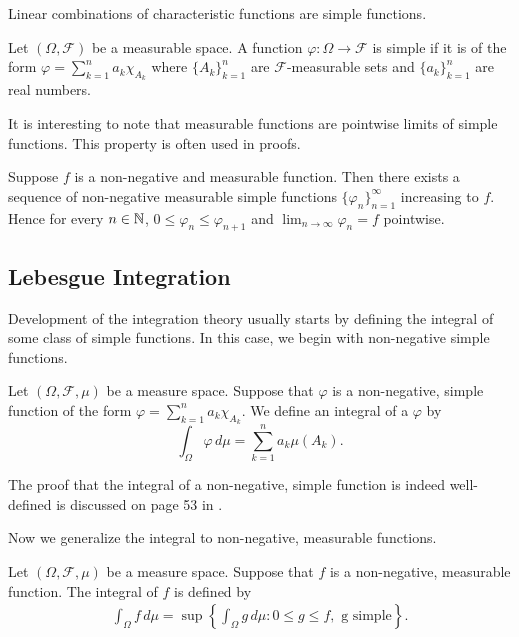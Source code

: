 Linear combinations of characteristic functions are simple functions.

\begin{definition}
Let $(\Omega, \mathcal{F})$ be a measurable space. A function $\varphi : \Omega \to \mathcal{F}$ is simple if it is of the form $\varphi = \sum_{k=1}^n a_k \chi_{A_k}$ where $\{ A_k \}_{k=1}^n$ are $\mathcal{F}$-measurable sets and $\{ a_k \}_{k=1}^n$ are real numbers. 
\end{definition}

It is interesting to note that measurable functions are pointwise limits of simple functions. This property is often used in proofs.
\begin{proposition}
Suppose $f$ is a non-negative and measurable function. Then there exists a sequence of non-negative measurable simple functions $\{ \varphi_n \}_{n=1}^\infty$ increasing to $f$. Hence for every $n \in {\mathbb N}$, $0 \leq \varphi_n \leq \varphi_{n + 1}$ and $\lim_{n \to \infty} \varphi_n = f$ pointwise.
\end{proposition}

\subsection{Lebesgue Integration}
Development of the integration theory usually starts by defining the integral of some class of simple functions. In this case, we begin with non-negative simple functions.
\begin{definition}
Let $(\Omega, \mathcal{F}, \mu)$ be a measure space. Suppose that $\varphi$ is a non-negative, simple function of the form
$\varphi = \sum_{k=1}^n a_k \chi_{A_k}$. We define an integral of a $\varphi$ by \[
    \int_{\Omega} \varphi \, d\mu = \sum_{k = 1}^n a_k \mu(A_k).
\]
\end{definition}
\begin{remark}
The proof that the integral of a non-negative, simple function is indeed well-defined is discussed on page 53 in \cite{cohn_2013_measure}.
\end{remark}

Now we generalize the integral to non-negative, measurable functions.

\begin{definition}
Let $(\Omega, \mathcal{F}, \mu)$ be a measure space. Suppose that $f$ is a non-negative, measurable function. 
The integral of $f$ is defined by
\begin{align*}
        \int_{\Omega} f \,d\mu = \sup \left \{ \int_{\Omega} g \,d\mu : 0 \leq g \leq f, \text{ g simple} \right \}.
\end{align*}
\end{definition}


